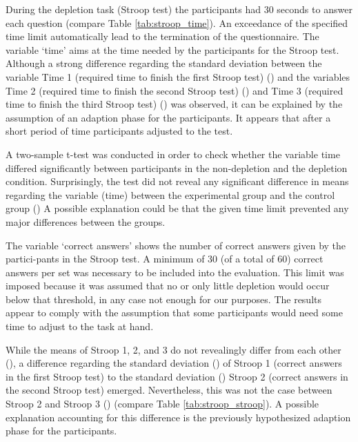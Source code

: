 During the depletion task (Stroop test) the participants had 30 seconds to answer each question (compare Table \ref{tab:stroop_time}). An exceedance of the specified time limit automatically lead to the termination of the questionnaire.  The variable ‘time’ aims at the time needed by the participants for the Stroop test. Although a strong difference regarding the standard deviation between the variable Time 1 (required time to finish the first Stroop test) () and the variables Time 2 (required time to finish the second Stroop test) () and Time 3 (required time to finish the third Stroop test) () was observed, it can be explained by the assumption of an adaption phase for the participants. It appears that after a short period of time participants adjusted to the test.\par
A two-sample t-test was conducted in order to check whether the variable time differed significantly between participants in the non-depletion and the depletion condition. Surprisingly, the test did not reveal any significant difference in means regarding the variable (time) between the experimental group and the control group () A possible explanation could be that the given time limit prevented any major differences between the groups. \par
The variable ‘correct answers’ shows the number of correct answers given by the partici-pants in the Stroop test. A minimum of 30 (of a total of 60) correct answers per set was necessary to be included into the evaluation. This limit was imposed because it was assumed that no or only little depletion would occur below that threshold, in any case not enough for our purposes. The results appear to comply with the assumption that some participants would need some time to adjust to the task at hand. \par
While the means of Stroop 1, 2, and 3 do not revealingly differ from each other (), a difference regarding the standard deviation () of Stroop 1 (correct answers in the first Stroop test) to the standard deviation () Stroop 2 (correct answers in the second Stroop test) emerged. Nevertheless, this was not the case between Stroop 2 and Stroop 3 () (compare Table \ref{tab:stroop_stroop}). A possible explanation accounting for this difference is the previously hypothesized adaption phase for the participants.\par

